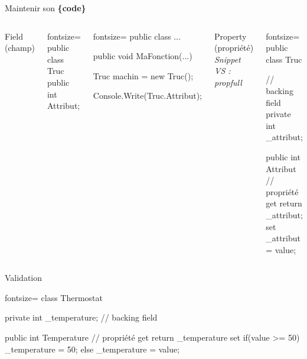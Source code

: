\documentclass[12pt]{beamer}
\begin{document}
\begingroup
{}
\begin{frame}
    \begin{center}
        \vspace{1cm}
        {\Large\color{background} Maintenir son \textbf{\{code\}}}
    \end{center}
\end{frame}
\endgroup

\begin{frame}[fragile]
    \begin{columns}[c]
        \column{2.3in}
    \begin{center}{\large Field (champ)}\end{center}
        \begin{csharpcode*}{fontsize=\scriptsize}
public class Truc
{
    public int Attribut;
}
        \end{csharpcode*}
        \pause
        \begin{csharpcode*}{fontsize=\scriptsize}
public class ...
{
    public void MaFonction(...)
    {
        Truc machin = new Truc();

        Console.Write(Truc.Attribut);
    }
}
        \end{csharpcode*}
        \pause
        \column{2.2in}
        \begin{center}
            {\large Property (propriété)}\\
            \emph{\scriptsize Snippet VS : propfull}
        \end{center}
        \begin{csharpcode*}{fontsize=\scriptsize}
public class Truc
{
    // backing field
    private int _attribut;

    public int Attribut // propriété
    {
        get { return _attribut; }
        set { _attribut = value; }
    }
}
        \end{csharpcode*}
    \end{columns}
\end{frame}

\begin{frame}[fragile]
    \begin{center}{\large Validation}\end{center}
    \begin{csharpcode*}{fontsize=\scriptsize}
class Thermostat
{
    private int _temperature; // backing field

    public int Temperature // propriété
    {
        get { return _temperature }
        set
        {
            if(value >= 50)
                _temperature = 50;
            else
                _temperature = value;
        }
    }
}
    \end{csharpcode*}
\end{frame}
\end{document}
